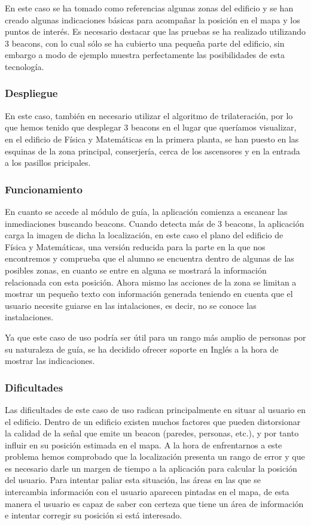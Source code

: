 En este caso se ha tomado como referencias algunas zonas del edificio y se han creado algunas indicaciones básicas para acompañar la posición en el mapa y los puntos de interés. Es necesario destacar que las pruebas se ha realizado utilizando 3 beacons, con lo cual sólo se ha cubierto una pequeña parte del edificio, sin embargo a modo de ejemplo muestra perfectamente las posibilidades de esta tecnología.

\subsubsection{Despliegue}

En este caso, también en necesario utilizar el algoritmo de trilateración, por lo que hemos tenido que desplegar 3 beacons en el lugar que queríamos visualizar, en el edificio de Física y Matemáticas en la primera planta, se han puesto en las esquinas de la zona principal, conserjería, cerca de los ascensores y en la entrada a los pasillos pricipales.

\subsubsection{Funcionamiento}


En cuanto se accede al módulo de guía, la aplicación comienza a escanear las inmediaciones buscando beacons. Cuando detecta más de 3 beacons, la aplicación carga la imagen de dicha la localización, en este caso el plano del edificio de Física y Matemáticas, una versión reducida para la parte en la que nos encontremos y comprueba que el alumno se encuentra dentro de algunas de las posibles zonas, en cuanto se entre en alguna se mostrará la información relacionada con esta posición. Ahora mismo las acciones de la zona se limitan a mostrar un pequeño texto con información generada teniendo en cuenta que el usuario necesite guiarse en las intalaciones, es decir, no se conoce las instalaciones.


Ya que este caso de uso podría ser útil para un rango más amplio de personas por su naturaleza de guía, se ha decidido ofrecer soporte en Inglés a la hora de mostrar las indicaciones.

\subsubsection{Dificultades}

Las dificultades de este caso de uso radican principalmente en situar al usuario en el edificio. Dentro de un edificio existen muchos factores que pueden distorsionar la calidad de la señal que emite un beacon (paredes, personas, etc.), y por tanto influir en su posición estimada en el mapa. A la hora de enfrentarnos a este problema hemos comprobado que la localización presenta un rango de error y que es necesario darle un margen de tiempo a la aplicación para calcular la posición del usuario. Para intentar paliar esta situación, las áreas en las que se intercambia información con el usuario aparecen pintadas en el mapa, de esta manera el usuario es capaz de saber con certeza que tiene un área de información e intentar corregir su posición si está interesado. 

